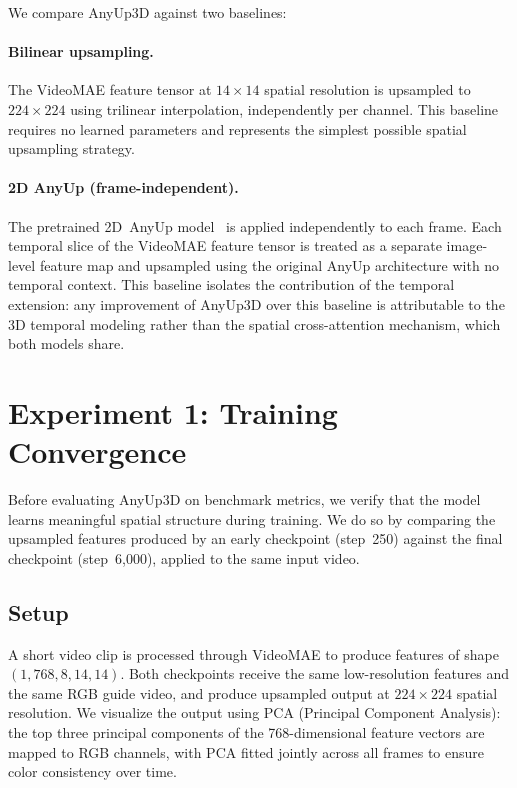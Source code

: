 We compare AnyUp3D against two baselines:

\paragraph{Bilinear upsampling.}
The VideoMAE feature tensor at $14 \times 14$ spatial resolution is upsampled to $224 \times 224$ using trilinear interpolation, independently per channel.
This baseline requires no learned parameters and represents the simplest possible spatial upsampling strategy.

\paragraph{2D AnyUp (frame-independent).}
The pretrained 2D~AnyUp model~\cite{anyup} is applied independently to each frame.
Each temporal slice of the VideoMAE feature tensor is treated as a separate image-level feature map and upsampled using the original AnyUp architecture with no temporal context.
This baseline isolates the contribution of the temporal extension: any improvement of AnyUp3D over this baseline is attributable to the 3D temporal modeling rather than the spatial cross-attention mechanism, which both models share.


\section{Experiment 1: Training Convergence}
\label{sec:convergence}

Before evaluating AnyUp3D on benchmark metrics, we verify that the model learns meaningful spatial structure during training.
We do so by comparing the upsampled features produced by an early checkpoint (step~250) against the final checkpoint (step~6{,}000), applied to the same input video.

\subsection{Setup}

A short video clip is processed through VideoMAE to produce features of shape $(1, 768, 8, 14, 14)$.
Both checkpoints receive the same low-resolution features and the same RGB guide video, and produce upsampled output at $224 \times 224$ spatial resolution.
We visualize the output using PCA (Principal Component Analysis): the top three principal components of the 768-dimensional feature vectors are mapped to RGB channels, with PCA fitted jointly across all frames to ensure color consistency over time.

